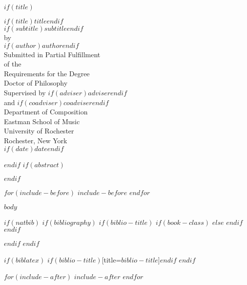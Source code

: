 \documentclass[$if(fontsize)$$fontsize$,$endif$$if(lang)$$babel-lang$,$endif$$if(papersize)$$papersize$paper,$endif$$for(classoption)$$classoption$$sep$,$endfor$]{$documentclass$}
\def\titlepage{
    \thispagestyle{empty}
    \begin{center}
        \parindent=0pt
        {\large{$if(title)$$title$$endif$}} \\ [8pt]
        {\large{$if(subtitle)$$subtitle$$endif$}} \\
        \vskip 18pt
        by \\ [8pt]
        $if(author)$$author$$endif$ \\ [8pt]
        \vskip 18pt
        Submitted in Partial Fulfillment \\ [8pt]
        of the \\ [8pt]
        Requirements for the Degree \\ [8pt]
        Doctor of Philosophy \\ [8pt]
        \vskip 18pt
        Supervised by $if(adviser)$$adviser$$endif$ \\ [8pt]
        and $if(coadviser)$$coadviser$$endif$ \\ [8pt]
        Department of \expandafter{Composition} \\ [8pt]
        Eastman School of Music \\ [8pt]
        \vskip 24pt
        University of Rochester \\ [8pt]
        Rochester, New York \\ [8pt]
        $if(date)$$date$$endif$
    \end{center}
    \newpage
    \pagestyle{fancy}
}
\begin{document}
$if(title)$
\titlepage
$endif$
$if(abstract)$
\begin{abstract}
$abstract$
\end{abstract}
$endif$

$for(include-before)$
$include-before$
$endfor$


$body$

$if(natbib)$
$if(bibliography)$
$if(biblio-title)$
$if(book-class)$
\renewcommand\bibname{$biblio-title$}
$else$
\renewcommand\refname{$biblio-title$}
$endif$
$endif$

$endif$
$endif$

$if(biblatex)$
\printbibliography$if(biblio-title)$[title=$biblio-title$]$endif$
$endif$

$for(include-after)$
$include-after$
$endfor$
\end{document}
